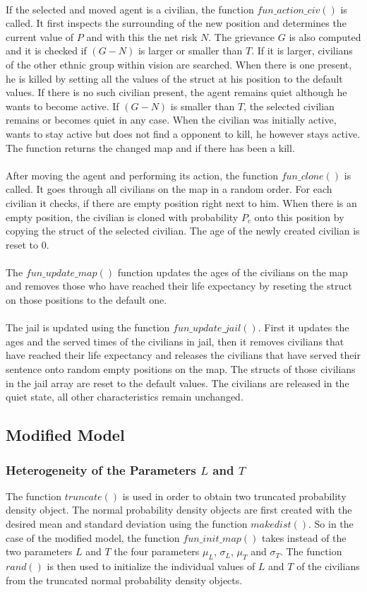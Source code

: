 \documentclass[11pt]{article}
\begin{document}
\\
If the selected and moved agent is a civilian, the function $fun\_action\_civ()$ is called. It first inspects the surrounding of the new position and determines the current value of $P$ and with this the net risk $N$. The grievance $G$ is also computed and it is checked if $(G-N)$ is larger or smaller than $T$. If it is larger, civilians of the other ethnic group within vision are searched. When there is one present, he is killed by setting all the values of the struct at his position to the default values. If there is no such civilian present, the agent remains quiet although he wants to become active. If $(G-N)$ is smaller than $T$, the selected civilian remains or becomes quiet in any case. When the civilian was initially active, wants to stay active but does not find a opponent to kill, he however stays active. The function returns the changed map and if there has been a kill.\\
\\
After moving the agent and performing its action, the function $fun\_clone()$ is called. It goes through all civilians on the map in a random order. For each civilian it checks, if there are empty position right next to him. When there is an empty position, the civilian is cloned with probability $P_c$ onto this position by copying the struct of the selected civilian. The age of the newly created civilian is reset to 0.\\
\\
The $fun\_update\_map()$ function updates the ages of the civilians on the map and removes those who have reached their life expectancy by reseting the struct on those positions to the default one.\\
\\
The jail is updated using the function $fun\_update\_jail()$. First it updates the ages and the served times of the civilians in jail, then it removes civilians that have reached their life expectancy and releases the civilians that have served their sentence onto random empty positions on the map. The structs of those civilians in the jail array are reset to the default values. The civilians are released in the quiet state, all other characteristics remain unchanged.

\subsection{Modified Model}

\subsubsection{Heterogeneity of the Parameters $L$ and $T$}
The function $truncate()$ is used in order to obtain two truncated probability density object. The normal probability density objects are first created with the desired mean and standard deviation using the function $makedist()$. So in the case of the modified model, the function $fun\_init\_map()$ takes instead of the two parameters $L$ and $T$ the four parameters $\mu_L$, $\sigma_L$, $\mu_T$ and $\sigma_T$. The function $rand()$ is then used to initialize the individual values of $L$ and $T$ of the civilians from the truncated normal probability density objects.
\end{document}
